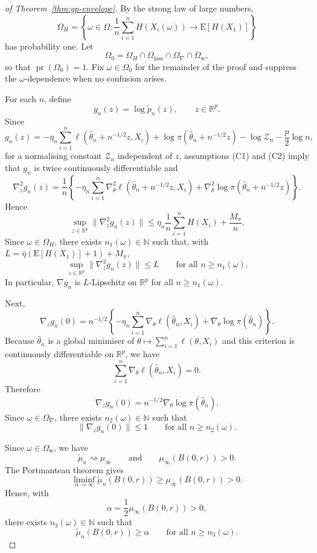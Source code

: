 \documentclass[11pt]{article}
\renewcommand{\Pr}{\operatorname{pr}}
\theoremstyle{plain}
\theoremstyle{definition}
\theoremstyle{remark}
\begin{document}
\begin{proof}[of Theorem~\ref{thm:gp-envelope}] By the strong
law of large numbers,
\[
\Omega_{H}=\left\{\omega\in\Omega: \frac{1}{n}\sum_{i=1}^{n}H(X_{i}(\omega))\to\mathrm{E}[H(X_{1})]\right\}
\]
has probability one. Let
\[
\Omega_{0}=\Omega_{H}\cap\Omega_{\mathrm{loss}}\cap\Omega_{\nabla}\cap\Omega_{\mathrm{w}},
\]
so that $\Pr(\Omega_{0})=1$. Fix $\omega\in\Omega_{0}$ for the remainder
of the proof and suppress the $\omega$-dependence when no confusion
arises.

For each $n$, define
\[
g_{n}(z)=\log \tilde p_{n}(z),\qquad z\in\mathbb{R}^{p}.
\]
Since
\[
g_{n}(z)=-\eta_{n}\sum_{i=1}^{n}\ell\!\left(\hat{\theta}_{n}+n^{-1/2}z,X_{i}\right)+\log\pi\!\left(\hat{\theta}_{n}+n^{-1/2}z\right)-\log\mathcal{Z}_{n}-\frac{p}{2}\log n,
\]
for a normalising constant $\mathcal{Z}_{n}$ independent of $z$,
assumptions {(C1)} and {(C2)} imply that $g_{n}$ is twice
continuously differentiable and
\[
\nabla_{z}^{2}g_{n}(z)=\frac{1}{n}\left\{ -\eta_{n}\sum_{i=1}^{n}\nabla_{\theta}^{2}\ell\!\left(\hat{\theta}_{n}+n^{-1/2}z,X_{i}\right)+\nabla_{\theta}^{2}\log\pi\!\left(\hat{\theta}_{n}+n^{-1/2}z\right)\right\} .
\]
Hence
\[
\sup_{z\in\mathbb{R}^{p}}\|\nabla_{z}^{2}g_{n}(z)\|\le\eta_{n}\frac{1}{n}\sum_{i=1}^{n}H(X_{i})+\frac{M_{\pi}}{n}.
\]
Since $\omega\in\Omega_{H}$, there exists $n_{1}(\omega)\in\mathbb{N}$
such that, with $L=\bar{\eta}\left(\mathrm{E}[H(X_{1})]+1\right)+M_{\pi}$,
\[
\sup_{z\in\mathbb{R}^{p}}\|\nabla_{z}^{2}g_{n}(z)\|\le L\qquad\text{for all }n\ge n_{1}(\omega).
\]
In particular, $\nabla g_{n}$ is $L$-Lipschitz on $\mathbb{R}^{p}$
for all $n\ge n_{1}(\omega)$.

Next,
\[
\nabla_{z}g_{n}(0)=n^{-1/2}\left\{ -\eta_{n}\sum_{i=1}^{n}\nabla_{\theta}\ell(\hat{\theta}_{n},X_{i})+\nabla_{\theta}\log\pi(\hat{\theta}_{n})\right\} .
\]
Because $\hat{\theta}_{n}$ is a global minimiser of $\theta\mapsto\sum_{i=1}^{n}\ell(\theta,X_{i})$
and this criterion is continuously differentiable on $\mathbb{R}^{p}$,
we have
\[
\sum_{i=1}^{n}\nabla_{\theta}\ell(\hat{\theta}_{n},X_{i})=0.
\]
Therefore
\[
\nabla_{z}g_{n}(0)=n^{-1/2}\nabla_{\theta}\log\pi(\hat{\theta}_{n}).
\]
Since $\omega\in\Omega_{\nabla}$, there exists $n_{2}(\omega)\in\mathbb{N}$
such that
\[
\|\nabla_{z}g_{n}(0)\|\le1\qquad\text{for all }n\ge n_{2}(\omega).
\]

Since $\omega\in\Omega_{\mathrm{w}}$, we have
\[
\tilde\mu_n\rightsquigarrow\mu_{\infty}\qquad\text{and}\qquad\mu_{\infty}(B(0,r))>0.
\]
The Portmanteau theorem gives
\[
\liminf_{n\to\infty}\tilde\mu_n(B(0,r))\ge\mu_{\infty}(B(0,r))>0.
\]
Hence, with
\[
\alpha=\frac{1}{2}\mu_{\infty}(B(0,r))>0,
\]
there exists $n_{3}(\omega)\in\mathbb{N}$ such that
\[
\tilde\mu_n(B(0,r))\ge\alpha\qquad\text{for all }n\ge n_{3}(\omega).
\]


\end{proof}
\end{document}
